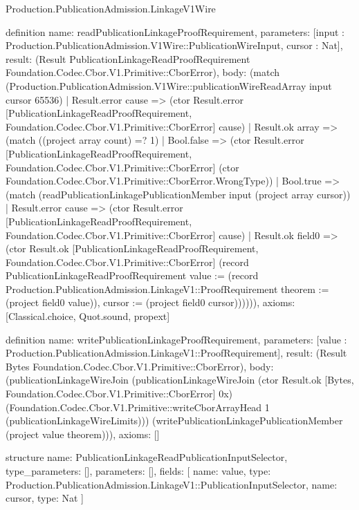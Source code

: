 \begin{lexlean}{Production.PublicationAdmission.LinkageV1Wire}
\begin{semanticmodule}
definition{
  name: readPublicationLinkageProofRequirement,
  parameters: [input : Production.PublicationAdmission.V1Wire::PublicationWireInput, cursor : Nat],
  result: (Result PublicationLinkageReadProofRequirement Foundation.Codec.Cbor.V1.Primitive::CborError),
  body: (match (Production.PublicationAdmission.V1Wire::publicationWireReadArray input cursor 65536)
    | Result.error cause => (ctor Result.error [PublicationLinkageReadProofRequirement, Foundation.Codec.Cbor.V1.Primitive::CborError] cause)
    | Result.ok array => (match ((project array count) =? 1)
      | Bool.false => (ctor Result.error [PublicationLinkageReadProofRequirement, Foundation.Codec.Cbor.V1.Primitive::CborError] (ctor Foundation.Codec.Cbor.V1.Primitive::CborError.WrongType))
      | Bool.true => (match (readPublicationLinkagePublicationMember input (project array cursor))
        | Result.error cause => (ctor Result.error [PublicationLinkageReadProofRequirement, Foundation.Codec.Cbor.V1.Primitive::CborError] cause)
        | Result.ok field0 => (ctor Result.ok [PublicationLinkageReadProofRequirement, Foundation.Codec.Cbor.V1.Primitive::CborError] (record PublicationLinkageReadProofRequirement {value := (record Production.PublicationAdmission.LinkageV1::ProofRequirement {theorem := (project field0 value)}), cursor := (project field0 cursor)}))))),
  axioms: [Classical.choice, Quot.sound, propext]
}

definition{
  name: writePublicationLinkageProofRequirement,
  parameters: [value : Production.PublicationAdmission.LinkageV1::ProofRequirement],
  result: (Result Bytes Foundation.Codec.Cbor.V1.Primitive::CborError),
  body: (publicationLinkageWireJoin (publicationLinkageWireJoin (ctor Result.ok [Bytes, Foundation.Codec.Cbor.V1.Primitive::CborError] 0x) (Foundation.Codec.Cbor.V1.Primitive::writeCborArrayHead 1 (publicationLinkageWireLimits))) (writePublicationLinkagePublicationMember (project value theorem))),
  axioms: []
}

structure{
  name: PublicationLinkageReadPublicationInputSelector,
  type_parameters: [],
  parameters: [],
  fields: [
    {name: value, type: Production.PublicationAdmission.LinkageV1::PublicationInputSelector},
    {name: cursor, type: Nat}
  ]
}


\end{semanticmodule}
\end{lexlean}
